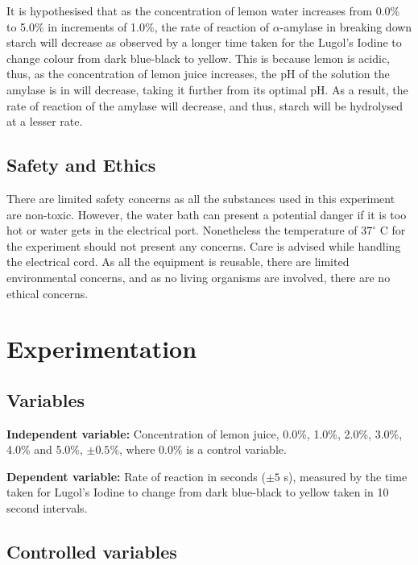 \documentclass[12pt]{article}
\begin{document}
It is hypothesised that as the concentration of lemon water increases from 0.0\% to 5.0\% in increments of 1.0\%, the rate of reaction of $\alpha$-amylase in breaking down starch will decrease as observed by a longer time taken for the Lugol's Iodine to change colour from dark blue-black to yellow. This is because lemon is acidic, thus, as the concentration of lemon juice increases, the pH of the solution the amylase is in will decrease, taking it further from its optimal pH. As a result, the rate of reaction of the amylase will decrease, and thus, starch will be hydrolysed at a lesser rate.

\subsection{Safety and Ethics}

There are limited safety concerns as all the substances used in this experiment are non-toxic. However, the water bath can present a potential danger if it is too hot or water gets in the electrical port. Nonetheless the temperature of $37^\circ$ C for the experiment should not present any concerns. Care is advised while handling the electrical cord. As all the equipment is reusable, there are limited environmental concerns, and as no living organisms are involved, there are no ethical concerns.


\section{Experimentation}

\subsection{Variables}

\textbf{Independent variable:} Concentration of lemon juice, 0.0\%, 1.0\%, 2.0\%, 3.0\%, 4.0\% and 5.0\%, $\pm 0.5\%$, where 0.0\% is a control variable.

\noindent
\textbf{Dependent variable:} Rate of reaction in seconds ($\pm 5$ s), measured by the time taken for Lugol's Iodine to change from dark blue-black to yellow taken in 10 second intervals.

\subsection{Controlled variables}
\end{document}
